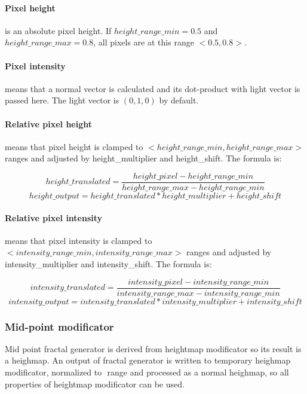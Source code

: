 \documentclass[9pt]{article}
\begin{document}
\paragraph*{Pixel height} is an absolute pixel height. 
If \(height\_range\_min = 0.5\) and \(height\_range\_max = 0.8\),
all pixels are at this range \(<0.5,0.8>\).

\paragraph*{Pixel intensity} means that a normal vector is 
calculated and its dot-product with light vector 
is passed here. The light vector is \((0,1,0)\) by default.

\paragraph*{Relative pixel height}
means that pixel height is clamped to \begin{math}<height\_range\_min, height\_range\_max>\end{math}
ranges and adjusted by height\_multiplier and height\_shift.
The formula is:

\[
height\_translated = \frac{height\_pixel - height\_range\_min}{height\_range\_max - height\_range\_min}
\]
\[
height\_output = height\_translated * height\_multiplier + height\_shift
\]

\paragraph*{Relative pixel intensity}
means that pixel intensity is clamped to \begin{math}<intensity\_range\_min, intensity\_range\_max>\end{math}
ranges and adjusted by intensity\_multiplier and intensity\_shift.
The formula is:

\[
intensity\_translated = \frac{intensity\_pixel - intensity\_range\_min}{intensity\_range\_max - intensity\_range\_min}
\]
\[
intensity\_output = intensity\_translated * intensity\_multiplier + intensity\_shift
\]

\newpage
\subsubsection{Mid-point modificator}

Mid point fractal generator is derived from heightmap modificator
so its result is a heighmap. An output of fractal generator is written to 
temporary heighmap modificator, normalized to \begin{math}<0,1>\end{math} 
range and processed as a normal heighmap, so all properties of heightmap 
modificator can be used.
\end{document}
